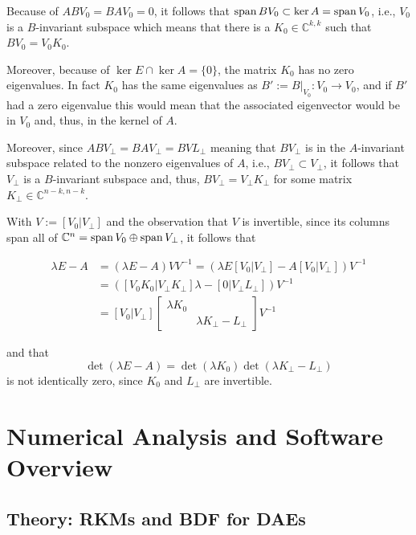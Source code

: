 \documentclass[]{book}
\theoremstyle{definition}
\theoremstyle{definition}
\theoremstyle{definition}
\theoremstyle{remark}
\begin{document}
Because of \(ABV_0=BAV_0=0\), it follows that
\(\operatorname{span} BV_0 \subset \ker A = \operatorname{span} V_0\), i.e., \(V_0\) is a
\(B\)-invariant subspace which means that there is a
\(K_0\in \mathbb C^{k,k}\) such that \(BV_0 =V_0K_0\).

Moreover, because of \(\ker E \cap \ker A = \{0\}\), the matrix \(K_0\)
has no zero eigenvalues. In fact \(K_0\) has the same eigenvalues as
\(B':=B\bigr|_{V_0}\colon V_0 \to V_0\), and if \(B'\) had a zero
eigenvalue this would mean that the associated eigenvector would be in
\(V_0\) and, thus, in the kernel of \(A\).

Moreover, since \(ABV_\perp=BAV_\perp=BVL_\perp\) meaning that
\(BV_\perp\) is in the \(A\)-invariant subspace related to the nonzero
eigenvalues of \(A\), i.e., \(BV_\perp \subset V_\perp\), it follows
that \(V_\perp\) is a \(B\)-invariant subspace and, thus,
\(BV_\perp = V_\perp K_\perp\) for some matrix
\(K_\perp \in \mathbb C^{n-k,n-k}\).

With \(V:=[V_0 |V_\perp]\) and the observation that \(V\) is invertible,
since its columns span all of
\(\mathbb C^n = \operatorname{span} V_0 \oplus \operatorname{span} V_\perp\), it follows that

\begin{equation*}
\begin{split}
\lambda E - A & = (\lambda E - A)VV^{-1} = (\lambda E [V_0 |V_\perp]- A[V_0 |V_\perp])V^{-1}  \\
& = ([V_0 K_0 |V_\perp K_\perp]\lambda  - [0 |V_\perp L_\perp])V^{-1} \\
& = [V_0 |V_\perp ]
\begin{bmatrix}
 \lambda K_0 & \\ & \lambda K_\perp - L_\perp
\end{bmatrix}
V^{-1}
\end{split}
\end{equation*}

and that \[
\det (\lambda E - A) = \det (\lambda K_0) \det(\lambda K_\perp - L_\perp) 
\] is not identically zero, since \(K_0\) and \(L_\perp\) are
invertible.

\chapter{Numerical Analysis and Software
Overview}\label{numerical-analysis-and-software-overview}

\section{Theory: RKMs and BDF for
DAEs}\label{theory-rkms-and-bdf-for-daes}
\end{document}
